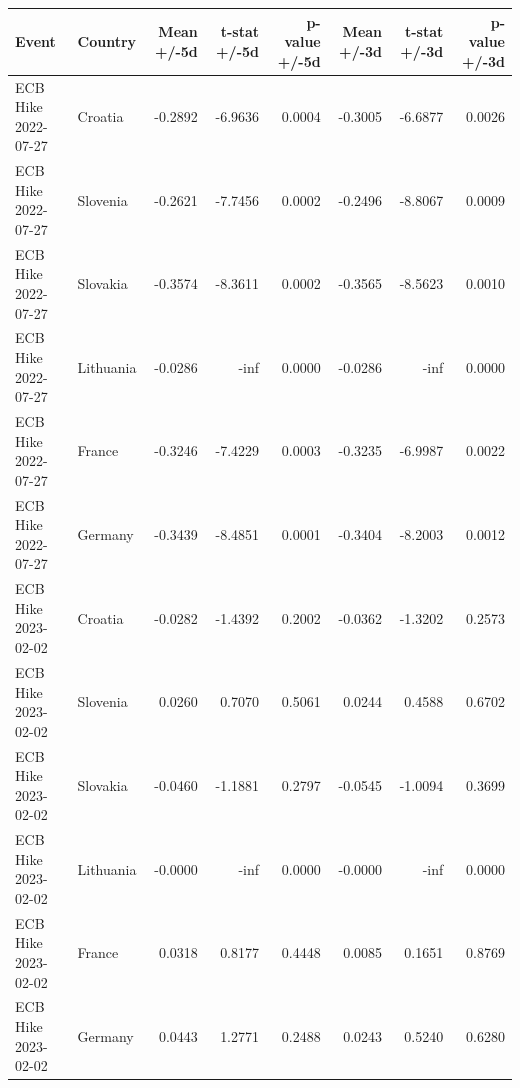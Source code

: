 \begin{tabular}{llrrrrrr}
\hline
Event & Country & Mean +/-5d & t-stat +/-5d & p-value +/-5d & Mean +/-3d & t-stat +/-3d & p-value +/-3d \\
\hline
ECB Hike 2022-07-27 & Croatia & -0.2892 & -6.9636 & 0.0004 & -0.3005 & -6.6877 & 0.0026 \\
ECB Hike 2022-07-27 & Slovenia & -0.2621 & -7.7456 & 0.0002 & -0.2496 & -8.8067 & 0.0009 \\
ECB Hike 2022-07-27 & Slovakia & -0.3574 & -8.3611 & 0.0002 & -0.3565 & -8.5623 & 0.0010 \\
ECB Hike 2022-07-27 & Lithuania & -0.0286 & -inf & 0.0000 & -0.0286 & -inf & 0.0000 \\
ECB Hike 2022-07-27 & France & -0.3246 & -7.4229 & 0.0003 & -0.3235 & -6.9987 & 0.0022 \\
ECB Hike 2022-07-27 & Germany & -0.3439 & -8.4851 & 0.0001 & -0.3404 & -8.2003 & 0.0012 \\
ECB Hike 2023-02-02 & Croatia & -0.0282 & -1.4392 & 0.2002 & -0.0362 & -1.3202 & 0.2573 \\
ECB Hike 2023-02-02 & Slovenia & 0.0260 & 0.7070 & 0.5061 & 0.0244 & 0.4588 & 0.6702 \\
ECB Hike 2023-02-02 & Slovakia & -0.0460 & -1.1881 & 0.2797 & -0.0545 & -1.0094 & 0.3699 \\
ECB Hike 2023-02-02 & Lithuania & -0.0000 & -inf & 0.0000 & -0.0000 & -inf & 0.0000 \\
ECB Hike 2023-02-02 & France & 0.0318 & 0.8177 & 0.4448 & 0.0085 & 0.1651 & 0.8769 \\
ECB Hike 2023-02-02 & Germany & 0.0443 & 1.2771 & 0.2488 & 0.0243 & 0.5240 & 0.6280 \\
\hline
\end{tabular}
